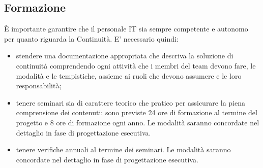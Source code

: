 \subsection{Formazione}
È importante garantire che il personale IT sia sempre competente e autonomo per quanto riguarda la Continuità. E' necessario quindi:
\begin{itemize}
\item stendere una documentazione appropriata che descriva la soluzione di continuità comprendendo ogni attività che i membri del team devono fare, le modalità e le tempistiche, assieme ai ruoli che devono assumere e le loro responsabilità;
\item tenere seminari sia di carattere teorico che pratico per assicurare la piena comprensione dei contenuti: sono previste 24 ore di formazione al termine del progetto e 8 ore di formazione ogni anno. Le modalità saranno concordate nel dettaglio in fase di progettazione esecutiva.
\item tenere verifiche annuali al termine dei seminari. Le modalità saranno concordate nel dettaglio in fase di progettazione esecutiva.
\end{itemize}
